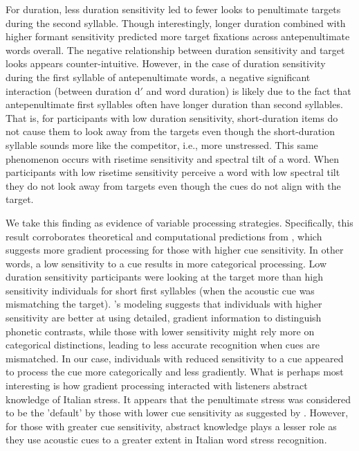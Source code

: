 For duration, less duration sensitivity led to fewer looks to penultimate targets during the second syllable. Though interestingly, longer duration combined with higher formant sensitivity predicted more target fixations across antepenultimate words overall. The negative relationship between duration sensitivity and target looks appears counter-intuitive. However, in the case of duration sensitivity during the first syllable of antepenultimate words, a negative significant interaction (between duration d$'$ and word duration) is likely due to the fact that antepenultimate first syllables often have longer duration than second syllables. That is, for participants with low duration sensitivity, short-duration items do not cause them to look away from the targets even though the short-duration syllable sounds more like the competitor, i.e., more unstressed. This same phenomenon occurs with risetime sensitivity and spectral tilt of a word. When participants with low risetime sensitivity perceive a word with low spectral tilt they do not look away from targets even though the cues do not align with the target. 

We take this finding as evidence of variable processing strategies. Specifically, this result corroborates theoretical and computational predictions from \cite{mcmurray_2009}, which suggests more gradient processing for those with higher cue sensitivity. In other words, a low sensitivity to a cue results in more categorical processing. Low duration sensitivity participants were looking at the target more than high sensitivity individuals for short first syllables (when the acoustic cue was mismatching the target). \cite{mcmurray_2009}'s modeling suggests that individuals with higher sensitivity are better at using detailed, gradient information to distinguish phonetic contrasts, while those with lower sensitivity might rely more on categorical distinctions, leading to less accurate recognition when cues are mismatched. In our case, individuals with reduced sensitivity to a cue appeared to process the cue more categorically and less gradiently. What is perhaps most interesting is how gradient processing interacted with listeners abstract knowledge of Italian stress. It appears that the penultimate stress was considered to be the 'default' by those with lower cue sensitivity  as suggested by \cite{Sulpizio_McQueen_2012}. However, for those with greater cue sensitivity, abstract knowledge plays a lesser role as they use acoustic cues to a greater extent in Italian word stress recognition. 



